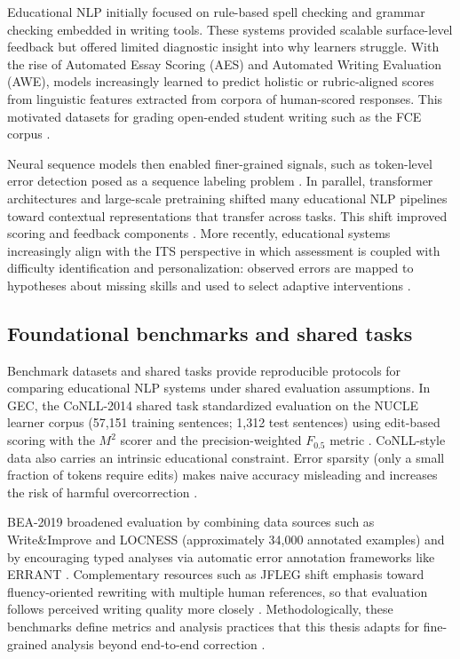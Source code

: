 Educational NLP initially focused on rule-based spell checking and grammar checking embedded in writing tools. These systems provided scalable surface-level feedback but offered limited diagnostic insight into why learners struggle. With the rise of Automated Essay Scoring (AES) and Automated Writing Evaluation (AWE), models increasingly learned to predict holistic or rubric-aligned scores from linguistic features extracted from corpora of human-scored responses. This motivated datasets for grading open-ended student writing such as the FCE corpus \parencite{YannakoudakisBriscoeMedlock2011,Bryant2023GECsurvey}.

Neural sequence models then enabled finer-grained signals, such as token-level error detection posed as a sequence labeling problem \parencite{ReiYannakoudakis2016}. In parallel, transformer architectures and large-scale pretraining shifted many educational NLP pipelines toward contextual representations that transfer across tasks. This shift improved scoring and feedback components \parencite{Vaswani2017,Devlin2019,Liu2019RoBERTa}. More recently, educational systems increasingly align with the ITS perspective in which assessment is coupled with difficulty identification and personalization: observed errors are mapped to hypotheses about missing skills and used to select adaptive interventions \parencite{Woolf2010,VanLehn2006}.

\subsection{Foundational benchmarks and shared tasks}
\label{sec:sota_nlp_edu_benchmarks}

Benchmark datasets and shared tasks provide reproducible protocols for comparing educational NLP systems under shared evaluation assumptions. In GEC, the CoNLL-2014 shared task standardized evaluation on the NUCLE learner corpus (57{,}151 training sentences; 1{,}312 test sentences) using edit-based scoring with the \(M^2\) scorer and the precision-weighted \(F_{0.5}\) metric \parencite{Ng2014,DahlmeierNg2012}. CoNLL-style data also carries an intrinsic educational constraint. Error sparsity (only a small fraction of tokens require edits) makes naive accuracy misleading and increases the risk of harmful overcorrection \parencite{Ng2014}.

BEA-2019 broadened evaluation by combining data sources such as Write\&Improve and LOCNESS (approximately 34{,}000 annotated examples) and by encouraging typed analyses via automatic error annotation frameworks like ERRANT \parencite{Bryant2019,BryantFeliceBriscoe2017}. Complementary resources such as JFLEG shift emphasis toward fluency-oriented rewriting with multiple human references, so that evaluation follows perceived writing quality more closely \parencite{Napoles2017}. Methodologically, these benchmarks define metrics and analysis practices that this thesis adapts for fine-grained analysis beyond end-to-end correction \parencite{Ng2014,Bryant2019}.

